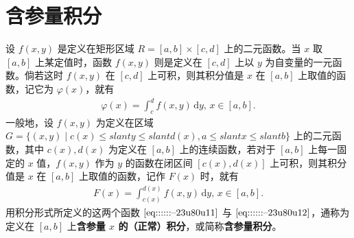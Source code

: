 \documentclass[../../main.tex]{subfiles}
\begin{document}
\section{含参量积分}

\begin{definition}[含参量积分]
设 \( f(x,y) \) 是定义在矩形区域 \( R = [a,b] \times [c,d] \) 上的二元函数。当 \( x \) 取 \( [a,b] \) 上某定值时，函数 \( f(x,y) \) 则是定义在 \( [c,d] \) 上以 \( y \) 为自变量的一元函数。倘若这时 \( f(x,y) \) 在 \( [c,d] \) 上可积，则其积分值是 \( x \) 在 \( [a,b] \) 上取值的函数，记它为 \( \varphi(x) \)，就有
\begin{align}
\varphi(x) = \int_{c}^{d} f(x,y) \, \mathrm{d}y, \, x \in [a,b]. \label{eq::::::--23u80u11}
\end{align}
一般地，设 \( f(x,y) \) 为定义在区域 \( G = \{ (x,y) \mid c(x) \leqslant slant y \leqslant slant d(x), a \leqslant slant x \leqslant slant b \} \) 上的二元函数，其中 \( c(x), d(x) \) 为定义在 \( [a,b] \) 上的连续函数，若对于 \( [a,b] \) 上每一固定的 \( x \) 值，\( f(x,y) \) 作为 \( y \) 的函数在闭区间 \( [c(x),d(x)] \) 上可积，则其积分值是 \( x \) 在 \( [a,b] \) 上取值的函数，记作 \( F(x) \) 时，就有
\begin{align}
F(x) = \int_{c(x)}^{d(x)} f(x,y) \, \mathrm{d}y, \, x \in [a,b]. \label{eq::::::--23u80u12}
\end{align}
用积分形式所定义的这两个函数 \(\eqref{eq::::::--23u80u11}\) 与 \(\eqref{eq::::::--23u80u12}\)，通称为定义在 \( [a,b] \) 上\textbf{含参量 \( x \) 的（正常）积分}，或简称\textbf{含参量积分}。
\end{definition}
\end{document}
